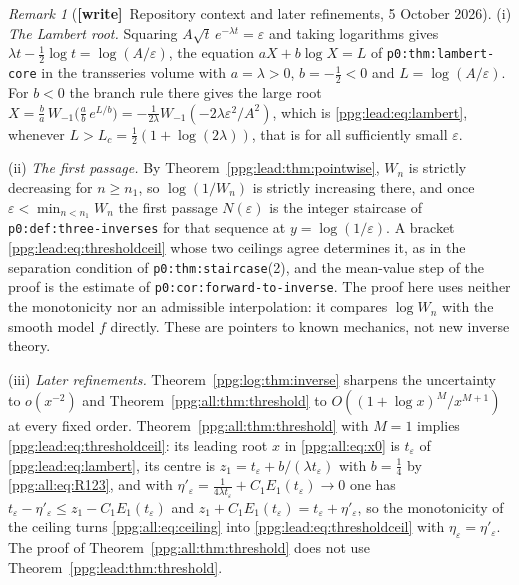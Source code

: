 \documentclass[11pt,letterpaper]{article}
\theoremstyle{remark}\newtheorem{remark}[theorem]{Remark}
\numberwithin{equation}{section}
\newcommand{\wtag}{\textup{\textbf{[write]}}}
\begin{document}
\begin{remark}[\wtag\ Repository context and later refinements, 5 October 2026]\label{ppg:lead:rem:inverse}
(i) \emph{The Lambert root.} Squaring $A\sqrt t\,e^{-\lambda t}=\varepsilon$ and taking logarithms gives $\lambda t-\frac12\log t=\log(A/\varepsilon)$, the equation $aX+b\log X=L$ of \texttt{p0:thm:lambert-core} in the transseries volume \cite{tsvol} with $a=\lambda>0$, $b=-\frac12<0$ and $L=\log(A/\varepsilon)$. For $b<0$ the branch rule there gives the large root $X=\frac ba\,W_{-1}\bigl(\frac ab\,e^{L/b}\bigr)=-\frac1{2\lambda}W_{-1}(-2\lambda\varepsilon^2/A^2)$, which is \eqref{ppg:lead:eq:lambert}, whenever $L>L_c=\frac12(1+\log(2\lambda))$, that is for all sufficiently small $\varepsilon$.

(ii) \emph{The first passage.} By Theorem~\ref{ppg:lead:thm:pointwise}, $W_n$ is strictly decreasing for $n\ge n_1$, so $\log(1/W_n)$ is strictly increasing there, and once $\varepsilon<\min_{n<n_1}W_n$ the first passage $N(\varepsilon)$ is the integer staircase of \texttt{p0:def:three-inverses} for that sequence at $y=\log(1/\varepsilon)$. A bracket \eqref{ppg:lead:eq:thresholdceil} whose two ceilings agree determines it, as in the separation condition of \texttt{p0:thm:staircase}(2), and the mean-value step of the proof is the estimate of \texttt{p0:cor:forward-to-inverse}. The proof here uses neither the monotonicity nor an admissible interpolation: it compares $\log W_n$ with the smooth model $f$ directly. These are pointers to known mechanics, not new inverse theory.

(iii) \emph{Later refinements.} Theorem~\ref{ppg:log:thm:inverse} sharpens the uncertainty to $o(x^{-2})$ and Theorem~\ref{ppg:all:thm:threshold} to $O((1+\log x)^M/x^{M+1})$ at every fixed order. Theorem~\ref{ppg:all:thm:threshold} with $M=1$ implies \eqref{ppg:lead:eq:thresholdceil}: its leading root $x$ in \eqref{ppg:all:eq:x0} is $t_\varepsilon$ of \eqref{ppg:lead:eq:lambert}, its centre is $z_1=t_\varepsilon+b/(\lambda t_\varepsilon)$ with $b=\frac14$ by \eqref{ppg:all:eq:R123}, and with $\eta'_\varepsilon=\frac1{4\lambda t_\varepsilon}+C_1E_1(t_\varepsilon)\to0$ one has $t_\varepsilon-\eta'_\varepsilon\le z_1-C_1E_1(t_\varepsilon)$ and $z_1+C_1E_1(t_\varepsilon)=t_\varepsilon+\eta'_\varepsilon$, so the monotonicity of the ceiling turns \eqref{ppg:all:eq:ceiling} into \eqref{ppg:lead:eq:thresholdceil} with $\eta_\varepsilon=\eta'_\varepsilon$. The proof of Theorem~\ref{ppg:all:thm:threshold} does not use Theorem~\ref{ppg:lead:thm:threshold}.
\end{remark}
\end{document}
